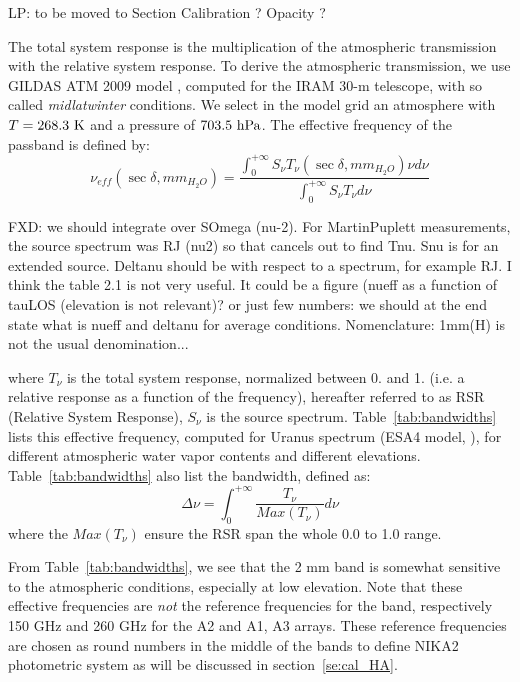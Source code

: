 {\color{red} LP: to be moved to Section Calibration ? Opacity ? }


The total system response is the multiplication of the atmospheric
transmission with the relative system response. To derive the
atmospheric transmission, we use GILDAS ATM 2009 model \cite{ATM}, computed for
the IRAM 30-m telescope, with so called {\it midlatwinter} conditions. We select in the model
grid an atmosphere with $T=268.3 \ {\rm K}$ and a pressure of $703.5 \ {\rm hPa}$. The
effective frequency of the passband is defined by:
\begin{equation}
\nu_{eff}( \sec \delta, mm_{H_{2}O}) = \frac{ \int_{0}^{+\infty} S_{\nu}
  T_{\nu}(\sec \delta, mm_{H_{2}O}) \nu d\nu } { \int_{0}^{+\infty} S_{\nu} T_{\nu} d\nu}
\label{eq:nueff0}
\end{equation}

{\color{blue} FXD: we should integrate over SOmega (nu-2). For
  MartinPuplett measurements, the source spectrum was RJ (nu2) so that
  cancels out to find Tnu. Snu is for an extended source. Deltanu
  should be with respect to a spectrum, for example RJ. I think the
  table 2.1 is not very useful. It could be a figure (nueff as a
  function of tauLOS (elevation is not relevant)? or just few numbers:
  we should at the end state what is nueff and deltanu for average
  conditions. Nomenclature: 1mm(H) is not the usual denomination... }


where $T_{\nu}$ is the total system response, normalized between
0. and 1. (i.e. a relative response as a function of the frequency),
hereafter referred to as RSR (Relative System Response), $S_{\nu}$ is
the source spectrum. Table~\ref{tab:bandwidths} lists this effective frequency,
computed for Uranus spectrum (ESA4 model, \cite{ESAmodel}), for different atmospheric
water vapor contents and different elevations. 
Table~\ref{tab:bandwidths} also list the bandwidth, defined as:
\begin{equation}
\Delta\nu = \int_{0}^{+\infty} \frac{T_{\nu}}{Max(T_{\nu})}
d\nu
\end{equation}
where the $Max(T_{\nu})$ ensure the RSR span the whole 0.0 to 1.0 range.

From Table~\ref{tab:bandwidths}, we see that the 2 mm band is somewhat
sensitive to the atmospheric conditions, especially at low
elevation. Note that these effective frequencies are {\em not} the
reference frequencies for the band, respectively 150 GHz and 260 GHz
for the A2 and A1, A3 arrays. These reference frequencies are chosen
as round numbers in the middle of the bands to define NIKA2
photometric system as will be discussed in section~\ref{se:cal_HA}.

